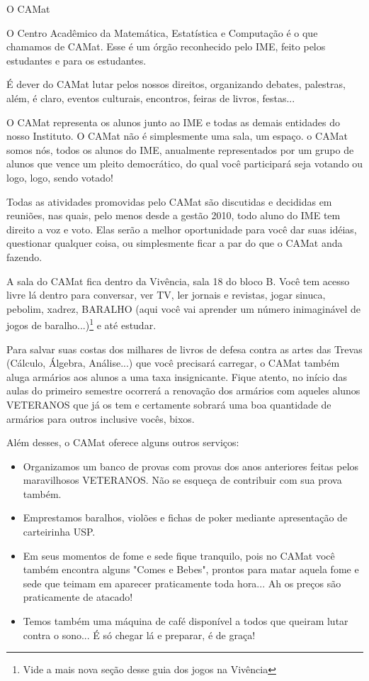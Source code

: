 \begin{secao}{O CAMat}

O Centro Acadêmico da Matemática, Estatística e Computação é o que chamamos de
CAMat. Esse é um órgão reconhecido pelo IME, feito pelos estudantes e para os
estudantes.

É dever do CAMat lutar pelos nossos direitos, organizando debates, palestras,
além, é claro, eventos culturais, encontros, feiras de livros, festas...

O CAMat representa os alunos junto ao IME e todas as demais entidades do nosso
Instituto. O CAMat não é simplesmente uma sala, um espaço. o CAMat somos nós,
todos os alunos do IME, anualmente representados por um grupo de alunos que
vence um pleito democrático, do qual você participará seja votando ou logo,
logo, sendo votado!

Todas as atividades promovidas pelo CAMat são discutidas e decididas em
reuniões, nas quais, pelo menos desde a gestão 2010, todo aluno do IME tem
direito a voz e voto. Elas serão a melhor oportunidade para você dar suas
idéias, questionar qualquer coisa, ou simplesmente ficar a par do que o CAMat
anda fazendo.

A sala do CAMat  fica dentro da Vivência, sala 18 do bloco B. Você tem acesso
livre lá dentro para conversar, ver TV, ler jornais e revistas, jogar sinuca, pebolim, xadrez, BARALHO (aqui você vai aprender um número inimaginável de
jogos de baralho...)\footnote{Vide a mais nova seção desse guia dos jogos na
Vivência} e até estudar.

Para salvar suas costas dos milhares de livros de defesa contra as artes das
Trevas (Cálculo, Álgebra, Análise...) que você precisará carregar, o CAMat
também aluga armários aos alunos a uma taxa insignicante. Fique atento, no
início das aulas do primeiro semestre ocorrerá a renovação dos armários com
aqueles alunos VETERANOS que já os tem e certamente sobrará uma boa quantidade
de armários para outros inclusive vocês, bixos.

Além desses, o CAMat oferece alguns outros serviços:

\begin{itemize}
\item Organizamos um banco de provas com provas dos anos anteriores feitas
pelos maravilhosos VETERANOS. Não se esqueça de contribuir com sua prova também.
\item Emprestamos baralhos, violões e fichas de poker mediante apresentação de
carteirinha USP.
\item Em seus momentos de fome e sede fique tranquilo, pois no CAMat você
também encontra alguns "Comes e Bebes", prontos para matar aquela fome e sede
que teimam em aparecer praticamente toda hora... Ah os preços são praticamente
de atacado!
\item Temos também uma máquina de café disponível a todos que queiram lutar
contra o sono... É só chegar lá e preparar, é de graça!
\end{itemize}


\end{secao}

